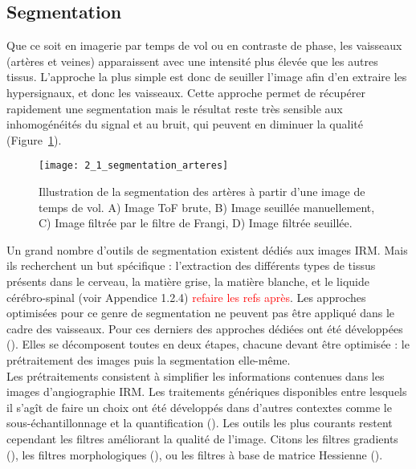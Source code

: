 \subsection{Segmentation}
Que ce soit en imagerie par temps de vol ou en contraste de phase, les vaisseaux (artères et veines) apparaissent avec une intensité plus élevée que les autres tissus. L’approche la plus simple est donc de seuiller l’image afin d’en extraire les hypersignaux, et donc les vaisseaux. Cette approche permet de récupérer rapidement une segmentation mais le résultat reste très sensible aux inhomogénéités du signal et au bruit, qui peuvent en diminuer la qualité (Figure~\ref{fig:2_1_segmentation_arteres}).\\
\begin{figure}[!t]
\centering
\texttt{[image: 2\_1\_segmentation\_arteres]}
\caption{Illustration de la segmentation des artères à partir d’une image de temps de vol. A) Image ToF brute, B) Image seuillée manuellement, C) Image filtrée par le filtre de Frangi, D) Image filtrée seuillée.}
\label{fig:2_1_segmentation_arteres}	
\end{figure}
Un grand nombre d’outils de segmentation existent dédiés aux images IRM. Mais ils recherchent un but spécifique : l’extraction des différents types de tissus présents dans le cerveau, la matière grise, la matière blanche, et le liquide cérébro-spinal (voir Appendice 1.2.4) \textcolor{red}{refaire les refs après}.  Les approches optimisées pour ce genre de segmentation ne peuvent pas être appliqué dans le cadre des vaisseaux. Pour ces derniers des approches dédiées ont été développées (\cite{Lesage2009}). Elles se décomposent toutes en deux étapes, chacune devant être optimisée : le prétraitement des images puis la segmentation elle-même.\\
Les prétraitements consistent à simplifier les informations contenues dans les images d’angiographie IRM. Les traitements génériques disponibles entre lesquels il s’agît de faire un choix ont été développés dans d’autres contextes comme le sous-échantillonnage et la quantification (\cite{Tschirren2005}). Les outils les plus courants restent cependant les filtres améliorant la qualité de l’image. Citons les filtres gradients  (\cite{Koller1995}), les filtres morphologiques (\cite{Wilkinson2001}), ou les filtres à base de matrice Hessienne (\cite{Frangi1998}). \\
